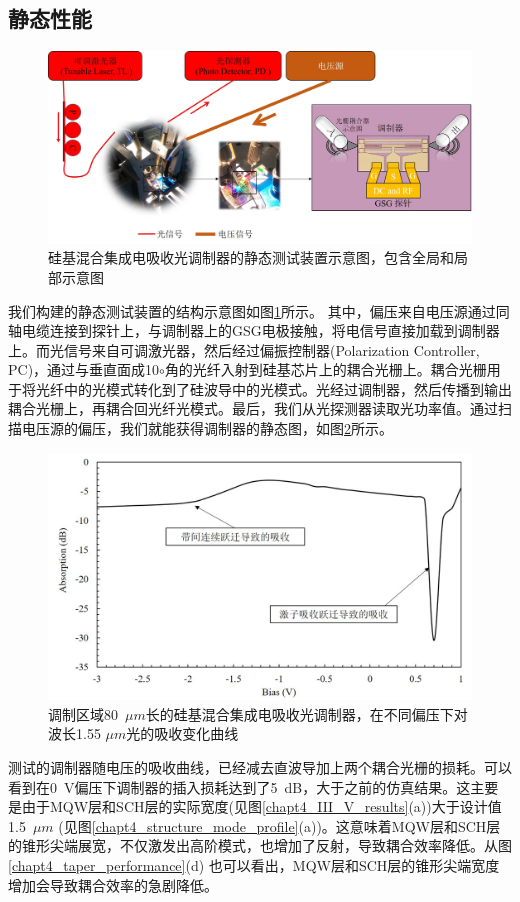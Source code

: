 \subsection{静态性能}
\begin{figure}[htb]
	\centering
	\includegraphics[width=15cm]{./Pictures/chapt4_static_measure_setup.jpg}
	\caption{硅基混合集成电吸收光调制器的静态测试装置示意图，包含全局和局部示意图}
	\label{chapt4_static_measure_setup}
\end{figure}
我们构建的静态测试装置的结构示意图如图\ref{chapt4_static_measure_setup}所示。 其中，偏压来自电压源通过同轴电缆连接到探针上，与调制器上的GSG电极接触，将电信号直接加载到调制器上。而光信号来自可调激光器，然后经过偏振控制器(Polarization Controller, PC)，通过与垂直面成10$\circ$角的光纤入射到硅基芯片上的耦合光栅上。耦合光栅用于将光纤中的光模式转化到了硅波导中的光模式。光经过调制器，然后传播到输出耦合光栅上，再耦合回光纤光模式。最后，我们从光探测器读取光功率值。通过扫描电压源的偏压，我们就能获得调制器的静态图，如图\ref{chapt4_static_measure_1550}所示。
\begin{figure}[htb]
	\centering
	\includegraphics[width=14cm]{./Pictures/chapt4_static_measure_1550.jpg}
	\caption{调制区域80~$\mu m$长的硅基混合集成电吸收光调制器，在不同偏压下对波长1.55 $\mu m$光的吸收变化曲线}
	\label{chapt4_static_measure_1550}
\end{figure}
测试的调制器随电压的吸收曲线，已经减去直波导加上两个耦合光栅的损耗。可以看到在0~V偏压下调制器的插入损耗达到了5~dB，大于之前的仿真结果。这主要是由于MQW层和SCH层的实际宽度(见图\ref{chapt4_III_V_results}(a))大于设计值1.5~$\mu m$ (见图\ref{chapt4_structure_mode_profile}(a))。这意味着MQW层和SCH层的锥形尖端展宽，不仅激发出高阶模式，也增加了反射，导致耦合效率降低。从图\ref{chapt4_taper_performance}(d) 也可以看出，MQW层和SCH层的锥形尖端宽度增加会导致耦合效率的急剧降低。

